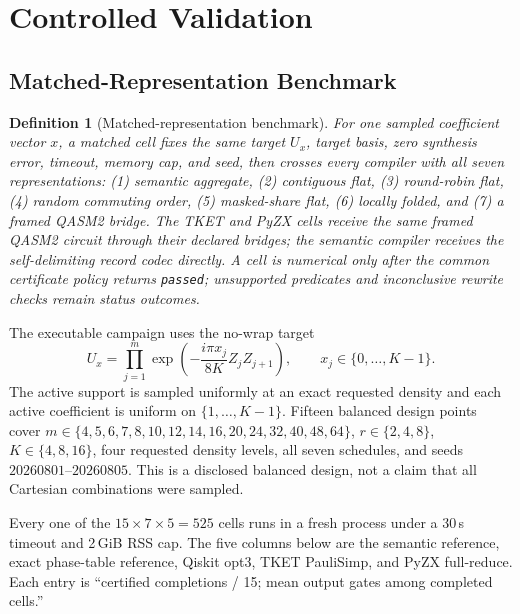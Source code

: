 \documentclass[aps,prx,reprint,floatfix,superscriptaddress]{revtex4-2}
\newtheorem{definition}{Definition}
\begin{document}
\section{Controlled Validation}
\label{sec:validation}

\subsection{Matched-Representation Benchmark}

\begin{definition}[Matched-representation benchmark]
\label{def:matched-benchmark}
For one sampled coefficient vector $x$, a matched cell fixes the same target
$U_x$, target basis, zero synthesis error, timeout, memory cap, and seed, then
crosses every compiler with all seven representations:
(1) semantic aggregate, (2) contiguous flat, (3) round-robin flat,
(4) random commuting order, (5) masked-share flat, (6) locally folded, and
(7) a framed QASM2 bridge.  The TKET and PyZX cells receive the same framed
QASM2 circuit through their declared bridges; the semantic compiler receives
the self-delimiting record codec directly.  A cell is numerical only after the
common certificate policy returns \texttt{passed}; unsupported predicates and
inconclusive rewrite checks remain status outcomes.
\end{definition}

The executable campaign uses the no-wrap target
\begin{equation*}
 U_x=\prod_{j=1}^{m}\exp\!\left(-\frac{i\pi x_j}{8K}Z_jZ_{j+1}\right),
 \qquad x_j\in\{0,\ldots,K-1\}.
\end{equation*}
The active support is sampled uniformly at an exact requested density and each
active coefficient is uniform on $\{1,\ldots,K-1\}$.  Fifteen balanced design
points cover
$m\in\{4,5,6,7,8,10,12,14,16,20,24,32,40,48,64\}$,
$r\in\{2,4,8\}$, $K\in\{4,8,16\}$, four requested density levels, all seven
schedules, and seeds $20260801$--$20260805$.  This is a disclosed balanced
design, not a claim that all Cartesian combinations were sampled.

Every one of the $15\times7\times5=525$ cells runs in a fresh process under a
30\,s timeout and 2\,GiB RSS cap.  The five columns below are the semantic
reference, exact phase-table reference, Qiskit opt3, TKET PauliSimp, and PyZX
full-reduce.  Each entry is ``certified completions / 15; mean output gates
among completed cells.''
\end{document}
